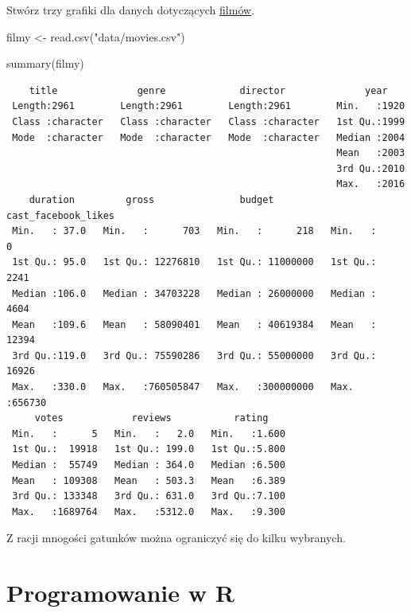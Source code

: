 \documentclass[
  letterpaper,
  DIV=11,
  numbers=noendperiod]{scrreprt}
\newenvironment{Shaded}{\begin{snugshade}}{\end{snugshade}}
\newcommand{\FunctionTok}[1]{\textcolor[rgb]{0.28,0.35,0.67}{#1}}
\newcommand{\NormalTok}[1]{\textcolor[rgb]{0.00,0.23,0.31}{#1}}
\newcommand{\OtherTok}[1]{\textcolor[rgb]{0.00,0.23,0.31}{#1}}
\newcommand{\StringTok}[1]{\textcolor[rgb]{0.13,0.47,0.30}{#1}}
\begin{document}
Stwórz trzy grafiki dla danych dotyczących
\href{data/movies.csv}{filmów}.

\begin{Shaded}
\begin{Highlighting}[]
\NormalTok{filmy }\OtherTok{\textless{}{-}} \FunctionTok{read.csv}\NormalTok{(}\StringTok{"data/movies.csv"}\NormalTok{)}

\FunctionTok{summary}\NormalTok{(filmy)}
\end{Highlighting}
\end{Shaded}

\begin{verbatim}
    title              genre             director              year     
 Length:2961        Length:2961        Length:2961        Min.   :1920  
 Class :character   Class :character   Class :character   1st Qu.:1999  
 Mode  :character   Mode  :character   Mode  :character   Median :2004  
                                                          Mean   :2003  
                                                          3rd Qu.:2010  
                                                          Max.   :2016  
    duration         gross               budget          cast_facebook_likes
 Min.   : 37.0   Min.   :      703   Min.   :      218   Min.   :     0     
 1st Qu.: 95.0   1st Qu.: 12276810   1st Qu.: 11000000   1st Qu.:  2241     
 Median :106.0   Median : 34703228   Median : 26000000   Median :  4604     
 Mean   :109.6   Mean   : 58090401   Mean   : 40619384   Mean   : 12394     
 3rd Qu.:119.0   3rd Qu.: 75590286   3rd Qu.: 55000000   3rd Qu.: 16926     
 Max.   :330.0   Max.   :760505847   Max.   :300000000   Max.   :656730     
     votes            reviews           rating     
 Min.   :      5   Min.   :   2.0   Min.   :1.600  
 1st Qu.:  19918   1st Qu.: 199.0   1st Qu.:5.800  
 Median :  55749   Median : 364.0   Median :6.500  
 Mean   : 109308   Mean   : 503.3   Mean   :6.389  
 3rd Qu.: 133348   3rd Qu.: 631.0   3rd Qu.:7.100  
 Max.   :1689764   Max.   :5312.0   Max.   :9.300  
\end{verbatim}

Z racji mnogości gatunków można ograniczyć się do kilku wybranych.


\hypertarget{programowanie-w-r}{%
\chapter{Programowanie w R}\label{programowanie-w-r}}
\end{document}
